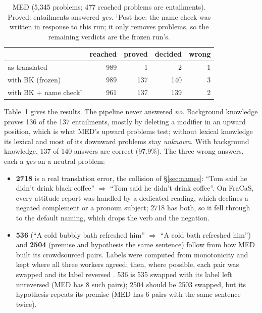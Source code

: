 \documentclass[11pt]{article}
\newcommand{\yes}{\textit{yes}}
\newcommand{\no}{\textit{no}}
\newcommand{\unk}{\textit{unknown}}
\begin{document}
\begin{table}[t]
\centering\small
\setlength{\tabcolsep}{4pt}
\begin{tabular}{lrrrr}
\toprule
& reached & proved & decided & wrong \\
\midrule
as translated & 989 & 1 & 2 & 1 \\
with BK (frozen) & 989 & 137 & 140 & 3 \\
with BK + name check$^\dagger$ & 961 & 137 & 139 & 2 \\
\bottomrule
\end{tabular}
\caption{MED (5,345 problems; 477 reached problems are entailments).
Proved: entailments answered \yes{}. $^\dagger$Post-hoc: the name check
was written in response to this run; it only removes problems, so the
remaining verdicts are the frozen run's.}
\label{tab:med}
\end{table}

Table~\ref{tab:med} gives the results. The pipeline never answered
\no{}. Background knowledge proves 136 of the 137 entailments, mostly by
deleting a modifier in an upward position, which is what MED's upward
problems test; without lexical knowledge its lexical and most of its
downward problems stay \unk{}. With background knowledge, 137 of 140
answers are correct (97.9\%). The three wrong answers, each a \yes{}
on a neutral problem:

\begin{itemize}
\item \textbf{2718} is a real translation error, the collision of
\S\ref{sec:names}: ``Tom said he didn't drink black coffee''
$\Rightarrow$ ``Tom said he didn't drink coffee''. On FraCaS, every
attitude report was handled by a dedicated reading, which declines a
negated complement or a pronoun subject; 2718 has both, so it fell
through to the default naming, which drops the verb and the negation.
\item \textbf{536} (``A cold bubbly bath refreshed him'' $\Rightarrow$
``A cold bath refreshed him'') and \textbf{2504} (premise and hypothesis
the same sentence) follow from how MED built its crowdsourced pairs.
Labels were computed from monotonicity and kept where all three
workers agreed; then, where possible, each pair was swapped and its
label reversed \citep[\S3.1.3]{yanaka-etal-2019-neural}.
536 is 535 swapped with its label left unreversed (MED has 8 such
pairs); 2504 should be 2503 swapped, but its hypothesis repeats its premise
(MED has 6 pairs with the same sentence twice).
\end{itemize}
\end{document}
